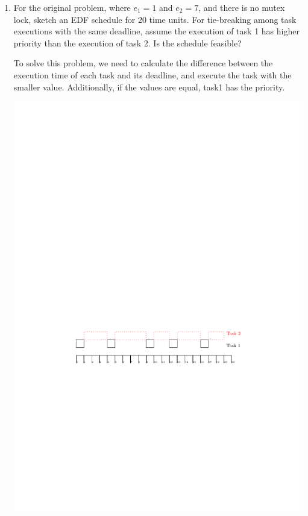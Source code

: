 \documentclass[12pt]{article}
\begin{document}
\begin{enumerate}
	\item 
	For the original problem, where $e_1 = 1$ and $e_2 = 7$, and there is no mutex
	lock, sketch an EDF schedule for 20 time units. For tie-breaking among task
	executions with the same deadline, assume the execution of task 1 has higher
	priority than the execution of task 2. Is the schedule feasible?
	\begin{qsolve}
		To solve this problem, we need to calculate the difference between the execution time of each task and its deadline, and execute the task with the smaller value. Additionally, if the values are equal, task1 has the priority.
		\begin{center}
			\includegraphics*[width=0.7\linewidth]{images/Q4/d.pdf}
		\end{center}
	\end{qsolve}
	
	
	

\end{enumerate}
\end{document}
